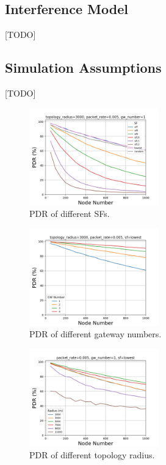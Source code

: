 \documentclass[conference]{IEEEtran}
\begin{document}
\subsection{Interference Model}
[TODO]

\subsection{Simulation Assumptions}
[TODO]

\begin{figure}
\centering
\includegraphics[width=0.5\textwidth]{sf_pdr}
\caption{PDR of different SFs.}
\label{fig:sf_pdr}
\end{figure}

\begin{figure}
\centering
\includegraphics[width=0.5\textwidth]{gw_pdr}
\caption{PDR of different gateway numbers.}
\label{fig:gw_pdr}
\end{figure}

\begin{figure}
\centering
\includegraphics[width=0.5\textwidth]{r_pdr}
\caption{PDR of different topology radius.}
\label{fig:r_pdr}
\end{figure}
\end{document}

